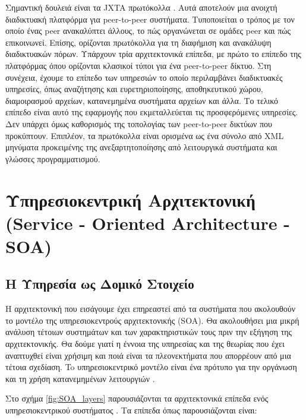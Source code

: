 Σημαντική δουλειά είναι τα JXTA πρωτόκολλα \citep{JXTA2007}. Αυτά 
αποτελούν μια ανοιχτή διαδικτυακή πλατφόρμα για peer-to-peer συστήματα. 
Τυποποιείται ο τρόπος με τον οποίο ένας peer ανακαλύπτει άλλους, το πώς 
οργανώνεται σε ομάδες peer και πώς επικοινωνεί. Επίσης, ορίζονται 
πρωτόκολλα για τη διαφήμιση και ανακάλυψη διαδικτυακών πόρων. Υπάρχουν 
τρία αρχιτεκτονικά επίπεδα, με πρώτο το επίπεδο της πλατφόρμας όπου 
ορίζονται κλασικοί τύποι για ένα peer-to-peer δίκτυο. Στη συνέχεια, 
έχουμε το επίπεδο των υπηρεσιών το οποίο περιλαμβάνει διαδικτυακές 
υπηρεσίες, όπως αναζήτησης και ευρετηριοποίησης, αποθηκευτικού χώρου, 
διαμοιρασμού αρχείων, κατανεμημένα συστήματα αρχείων και άλλα. Το τελικό 
επίπεδο είναι αυτό της εφαρμογής που εκμεταλλεύεται τις προσφερόμενες 
υπηρεσίες. Δεν υπάρχει όμως καθορισμός της τοπολογίας των peer-to-peer 
δικτύων που προκύπτουν. Επιπλέον, τα πρωτόκολλα είναι ορισμένα ως ένα σύνολο 
από XML μηνύματα προκειμένης της ανεξαρτητοποίησης από λειτουργικά 
συστήματα και γλώσσες προγραμματισμού.

\section[Υπηρεσιοκεντρική Αρχιτεκτονική]{Υπηρεσιοκεντρική Αρχιτεκτονική (Service - Oriented Architecture - SOA)}
\label{sec:SOA}

\subsection{Η Υπηρεσία ως Δομικό Στοιχείο}

Η αρχιτεκτονική που εισάγουμε έχει επηρεαστεί από τα συστήματα που 
ακολουθούν το μοντέλο της υπηρεσιοκεντρούς αρχιτεκτονικής (SOA). Θα 
ακολουθήσει μια μικρή ανάλυση τέτοιων συστημάτων και των χαρακτηριστικών 
τους πριν την εξήγηση της αρχιτεκτονικής. Θα δούμε γιατί η έννοια της 
υπηρεσίας και της θεωρίας που έχει αναπτυχθεί είναι χρήσιμη και ποιά 
είναι τα πλεονεκτήματα που απορρέουν από μια τέτοια σχεδίαση. To 
υπηρεσιοκεντρικό μοντέλο είναι ένα πρότυπο για την οργάνωση και τη χρήση 
κατανεμημένων λειτουργιών \citep{OASIS-soa-rm}. 

Στο σχήμα \ref{fig:SOA_layers} παρουσιάζονται τα αρχιτεκτονικά επίπεδα ενός 
υπηρεσιοκεντρικού συστήματος \citep{Bianco2011}. Τα επίπεδα όπως παρουσιάζονται είναι:

